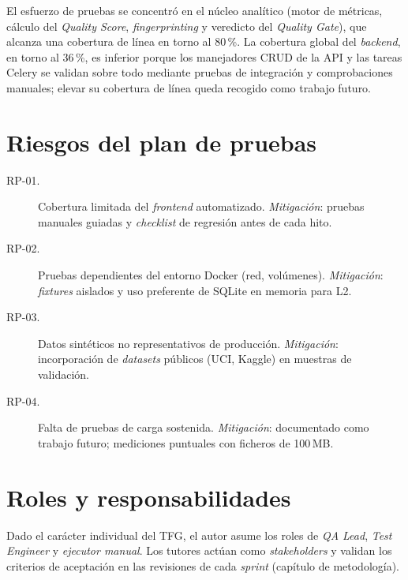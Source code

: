 El esfuerzo de pruebas se concentró en el núcleo analítico (motor de
métricas, cálculo del \emph{Quality Score}, \emph{fingerprinting} y
veredicto del \emph{Quality Gate}), que alcanza una cobertura de línea
en torno al 80\,\%.  La cobertura global del \emph{backend}, en torno al
36\,\%, es inferior porque los manejadores \acs{CRUD} de la \acs{API} y
las tareas Celery se validan sobre todo mediante pruebas de integración y
comprobaciones manuales; elevar su cobertura de línea queda recogido como
trabajo futuro.


\section{Riesgos del plan de pruebas}
\label{sec:anx-pruebas-riesgos}

\begin{description}
  \item[RP-01.]  Cobertura limitada del \emph{frontend} automatizado.
    \emph{Mitigación}: pruebas manuales guiadas y \emph{checklist} de
    regresión antes de cada hito.
  \item[RP-02.]  Pruebas dependientes del entorno Docker (red, volúmenes).
    \emph{Mitigación}: \emph{fixtures} aislados y uso preferente de
    SQLite en memoria para L2.
  \item[RP-03.]  Datos sintéticos no representativos de producción.
    \emph{Mitigación}: incorporación de \emph{datasets} públicos
    (\acs{UCI}, Kaggle) en muestras de validación.
  \item[RP-04.]  Falta de pruebas de carga sostenida.
    \emph{Mitigación}: documentado como trabajo futuro; mediciones
    puntuales con ficheros de 100\,\acs{MB}.
\end{description}


\section{Roles y responsabilidades}
\label{sec:anx-pruebas-roles}

Dado el carácter individual del \acs{TFG}, el autor asume los roles de
\emph{QA Lead}, \emph{Test Engineer} y \emph{ejecutor manual}.  Los tutores
actúan como \emph{stakeholders} y validan los criterios de aceptación en
las revisiones de cada \emph{sprint} (capítulo de metodología).


